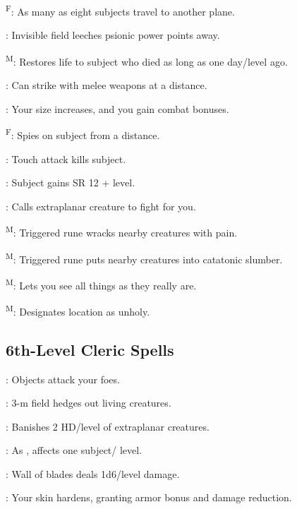 \textsuperscript{F}: As many as eight subjects travel to another plane.

: Invisible field leeches psionic power points away.

\textsuperscript{M}: Restores life to subject who died as long as one day/level ago.

: Can strike with melee weapons at a distance. %

: Your size increases, and you gain combat bonuses.

\textsuperscript{F}: Spies on subject from a distance.

: Touch attack kills subject.

: Subject gains SR 12 + level.

: Calls extraplanar creature to fight for you.

\textsuperscript{M}: Triggered rune wracks nearby creatures with pain.

\textsuperscript{M}: Triggered rune puts nearby creatures into catatonic slumber.

\textsuperscript{M}: Lets you see all things as they really are.

\textsuperscript{M}: Designates location as unholy.




\subsection{6th-Level Cleric Spells}

: Objects attack your foes.

: 3-m field hedges out living creatures.

: Banishes 2 HD/level of extraplanar creatures.

: As , affects one subject/ level.

: Wall of blades deals 1d6/level damage.

: Your skin hardens, granting armor bonus and damage reduction. %

